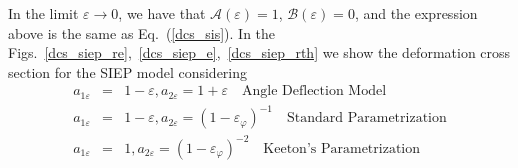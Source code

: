 In the limit $\varepsilon \rightarrow 0$, we have that $\mathcal{A}(\varepsilon)=1$, $\mathcal{B}(\varepsilon)=0$,  and the expression above is the same as Eq.~(\ref{dcs_sis}). In the Figs.~\ref{dcs_siep_re},~\ref{dcs_siep_e},~\ref{dcs_siep_rth} we show the deformation cross section for the SIEP model considering 
\begin{eqnarray}
 a_{1\varepsilon}&=&1-\varepsilon, a_{2\varepsilon}=1+\varepsilon \quad
\textrm{Angle Deflection Model} \\ 
a_{1\varepsilon} &=&1-\varepsilon,a_{2\varepsilon}=(1-\varepsilon_\varphi)^{-1} 
\quad
\textrm{Standard Parametrization} \\
a_{1\varepsilon} &=& 1, a_{2\varepsilon}=(1-\varepsilon_\varphi)^{-2}
\quad
\textrm{Keeton's Parametrization} 
\end{eqnarray}



